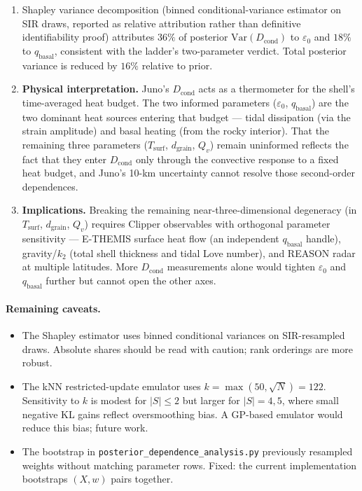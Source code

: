 \documentclass[11pt,a4paper]{article}
\begin{document}
\begin{enumerate}
\item Shapley variance decomposition (binned conditional-variance estimator
  on SIR draws, reported as relative attribution rather than definitive
  identifiability proof) attributes $36\%$ of posterior
  $\mathrm{Var}(D_\mathrm{cond})$ to $\varepsilon_0$ and $18\%$ to
  $q_\mathrm{basal}$, consistent with the ladder's two-parameter verdict.
  Total posterior variance is reduced by $16\%$ relative to prior.

\item \textbf{Physical interpretation.}  Juno's $D_\mathrm{cond}$ acts as a
  thermometer for the shell's time-averaged heat budget.  The two informed
  parameters ($\varepsilon_0$, $q_\mathrm{basal}$) are the two dominant heat
  sources entering that budget --- tidal dissipation (via the strain
  amplitude) and basal heating (from the rocky interior).  That the
  remaining three parameters ($T_\mathrm{surf}$, $d_\mathrm{grain}$, $Q_v$)
  remain uninformed reflects the fact that they enter $D_\mathrm{cond}$ only
  through the convective response to a fixed heat budget, and Juno's 10-km
  uncertainty cannot resolve those second-order dependences.

\item \textbf{Implications.}  Breaking the remaining near-three-dimensional
  degeneracy (in $T_\mathrm{surf}$, $d_\mathrm{grain}$, $Q_v$) requires
  Clipper observables with orthogonal parameter sensitivity --- E-THEMIS
  surface heat flow (an independent $q_\mathrm{basal}$ handle), gravity/$k_2$
  (total shell thickness and tidal Love number), and REASON radar at multiple
  latitudes.  More $D_\mathrm{cond}$ measurements alone would tighten
  $\varepsilon_0$ and $q_\mathrm{basal}$ further but cannot open the other
  axes.
\end{enumerate}

\paragraph{Remaining caveats.}
\begin{itemize}
\item The Shapley estimator uses binned conditional variances on SIR-resampled
  draws.  Absolute shares should be read with caution; rank orderings are
  more robust.
\item The kNN restricted-update emulator uses $k = \max(50, \sqrt{N}) = 122$.
  Sensitivity to $k$ is modest for $|S| \leq 2$ but larger for $|S| = 4, 5$,
  where small negative KL gains reflect oversmoothing bias.  A GP-based
  emulator would reduce this bias; future work.
\item The bootstrap in \texttt{posterior\_dependence\_analysis.py} previously
  resampled weights without matching parameter rows.  Fixed: the current
  implementation bootstraps $(X, w)$ pairs together.
\end{itemize}
\end{document}
